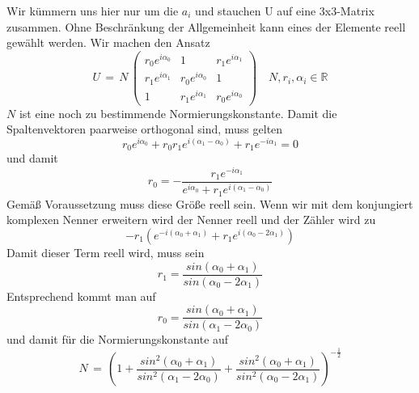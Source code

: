 \documentclass[12pt]{article}
\begin{document}
Wir kümmern uns hier nur um die $a_i$ und stauchen U auf eine 3x3-Matrix zusammen. Ohne Beschränkung der Allgemeinheit kann eines der Elemente reell gewählt werden. Wir machen den Ansatz
\begin{equation*}
U\, =\, N \, 
\begin{pmatrix}
r_0 e^{i\alpha_0} & 1 & r_1 e^{i\alpha_1} \\
r_1 e^{i\alpha_1} & r_0 e^{i\alpha_0} & 1 \\
1 & r_1 e^{i\alpha_1} & r_0 e^{i\alpha_0}
\end{pmatrix}
\quad N, r_i, \alpha_i \in \mathbb{R}
\end{equation*}
$N$ ist eine noch zu bestimmende Normierungskonstante. Damit die Spaltenvektoren paarweise orthogonal sind, muss gelten
\begin{equation*}
r_0 e^{i\alpha_0} + r_0 r_1 e^{i(\alpha_1 - \alpha_0)} + r_1 e^{-i\alpha_1} = 0
\end{equation*}
und damit 
\begin{equation*}
r_0 = - \frac{r_1 e^{-i\alpha_1}}{ e^{i\alpha_0} + r_1 e^{i(\alpha_1 - \alpha_0)} }
\end{equation*}
Gemäß Voraussetzung muss diese Größe reell sein. Wenn wir mit dem konjungiert komplexen Nenner erweitern wird der Nenner reell und der Zähler wird zu
\begin{equation*}
-r_1 \left( e^{-i(\alpha_0+\alpha_1)} + r_1 e^{i(\alpha_0-2\alpha_1)} \right)
\end{equation*}
Damit dieser Term reell wird, muss sein
\begin{equation*}
r_1=\frac{sin(\alpha_0+\alpha_1)}{sin(\alpha_0-2\alpha_1)}
\end{equation*}
Entsprechend kommt man auf 
\begin{equation*}
r_0=\frac{sin(\alpha_0+\alpha_1)}{sin(\alpha_1-2\alpha_0)}
\end{equation*}
und damit für die Normierungskonstante auf 
\begin{equation*}
N\, = \, \left( 1 +
\frac{sin^2(\alpha_0+\alpha_1)}{sin^2(\alpha_1-2\alpha_0)} +
\frac{sin^2(\alpha_0+\alpha_1)}{sin^2(\alpha_0-2\alpha_1)} \right)^{-\frac{1}{2}}
\end{equation*}
\end{document}
